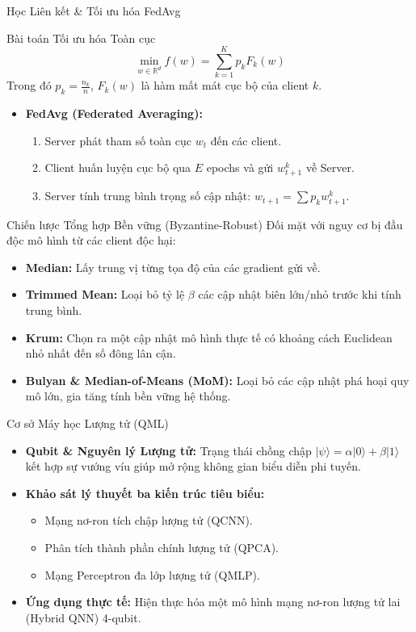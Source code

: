 \documentclass[10pt]{beamer}
\begin{document}
\begin{frame}{Học Liên kết \& Tối ưu hóa FedAvg}
    \begin{block}{Bài toán Tối ưu hóa Toàn cục}
        $$\min_{w \in \mathbb{R}^d} f(w) = \sum_{k=1}^{K} p_k F_k(w)$$
        Trong đó $p_k = \frac{n_k}{n}$, $F_k(w)$ là hàm mất mát cục bộ của client $k$.
    \end{block}
    \begin{itemize}
        \item \textbf{FedAvg (Federated Averaging):}
        \begin{enumerate}
            \item Server phát tham số toàn cục $w_t$ đến các client.
            \item Client huấn luyện cục bộ qua $E$ epochs và gửi $w_{t+1}^k$ về Server.
            \item Server tính trung bình trọng số cập nhật: $w_{t+1} = \sum p_k w_{t+1}^k$.
        \end{enumerate}
    \end{itemize}
\end{frame}

\begin{frame}{Chiến lược Tổng hợp Bền vững (Byzantine-Robust)}
    Đối mặt với nguy cơ bị đầu độc mô hình từ các client độc hại:
    \begin{itemize}
        \item \textbf{Median:} Lấy trung vị từng tọa độ của các gradient gửi về.
        \item \textbf{Trimmed Mean:} Loại bỏ tỷ lệ $\beta$ các cập nhật biên lớn/nhỏ trước khi tính trung bình.
        \item \textbf{Krum:} Chọn ra một cập nhật mô hình thực tế có khoảng cách Euclidean nhỏ nhất đến số đông lân cận.
        \item \textbf{Bulyan \& Median-of-Means (MoM):} Loại bỏ các cập nhật phá hoại quy mô lớn, gia tăng tính bền vững hệ thống.
    \end{itemize}
\end{frame}

\begin{frame}{Cơ sở Máy học Lượng tử (QML)}
    \begin{itemize}
        \item \textbf{Qubit \& Nguyên lý Lượng tử:} Trạng thái chồng chập $|\psi\rangle = \alpha|0\rangle + \beta|1\rangle$ kết hợp sự vướng víu giúp mở rộng không gian biểu diễn phi tuyến.
        \item \textbf{Khảo sát lý thuyết ba kiến trúc tiêu biểu:}
        \begin{itemize}
            \item Mạng nơ-ron tích chập lượng tử (QCNN).
            \item Phân tích thành phần chính lượng tử (QPCA).
            \item Mạng Perceptron đa lớp lượng tử (QMLP).
        \end{itemize}
        \item \textbf{Ứng dụng thực tế:} Hiện thực hóa một mô hình mạng nơ-ron lượng tử lai (Hybrid QNN) 4-qubit.
    \end{itemize}
\end{frame}
\end{document}

